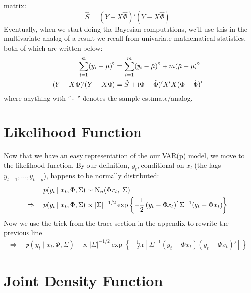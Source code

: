 \documentclass[a4paper,12pt]{scrartcl}
\begin{document}
matrix:
\begin{equation}
    \hat{S} = (Y - X\hat{\Phi})'(Y - X\hat{\Phi})
\end{equation}
Eventually, when we start doing the Bayesian computations, 
we'll use this in the multivariate analog of a result
we recall from univariate mathematical statistics, 
both of which are written below:
\begin{align}
    \sum^m_{i=1} (y_i - \mu)^2 &= \sum^m_{i=1} (y_i - \hat{\mu})^2
	+ m(\hat{\mu}-\mu)^2 \notag \\
    (Y - X\Phi)'(Y - X\Phi) &= \hat{S} + (\Phi - \hat{\Phi})'
	X'X(\Phi - \hat{\Phi})' \label{sumsq}
\end{align}
where anything with ``$\;\hat{\;}\;$'' denotes the sample
estimate/analog.










\newpage
\section{Likelihood Function}

Now that we have an easy representation of the our
VAR(p) model, we move to the likelihood function.
By our definition,  $y_t$, conditional on $x_t$ 
(the lags $y_{t-1}, \ldots, y_{t-p}$), happens
to be normally distributed:
\begin{align}
    p(y_t \; | \; x_t, \Phi, \Sigma) &\sim
	\text{N}_{n}(\Phi x_t, \; \Sigma) \notag \\
    \Rightarrow \quad p(y_t \; | \; x_t, \Phi, \Sigma) 
	&\propto |\Sigma|^{-1/2} 
	\exp\left\{ -\frac{1}{2} \left(y_t - \Phi x_t
	\right)' \Sigma^{-1} (y_t - \Phi x_t)\right\}
\end{align}
Now we use the trick from the trace section in the 
appendix to rewrite the previous line
\begin{align}
    \Rightarrow \quad p(y_t \; | \; x_t, \Phi, \Sigma) 
	&\propto |\Sigma|^{-1/2} 
	\exp\left\{ -\frac{1}{2} \text{tr} \left[ \Sigma^{-1}  
	(y_t - \Phi x_t)\left(y_t - \Phi x_t\right)'
	\right]\right\}
\end{align}





\newpage
\section{Joint Density Function}
\end{document}
